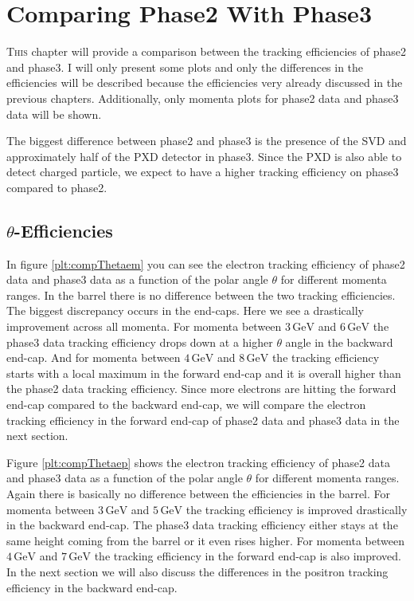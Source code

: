 \documentclass[a4paper,11pt,twosided,final,german,openbib,pdftex,listof=totoc,bibliography=totoc]{scrbook}
\begin{document}
\chapter{Comparing Phase2 With Phase3}
\label{cha:Comp}


\lettrine{T}{his} chapter will provide a comparison between the tracking efficiencies of phase2 and phase3. I will only present some plots and only the differences in the efficiencies will be described because the efficiencies very already discussed in the previous chapters. Additionally, only momenta plots for phase2 data and phase3 data will be shown.
\newline

The biggest difference between phase2 and phase3 is the presence of the SVD and approximately half of the PXD detector in phase3.
Since the PXD is also able to detect charged particle, we expect to have a higher tracking efficiency on phase3 compared to phase2.

\section{$\theta$-Efficiencies}


In figure \ref{plt:compThetaem} you can see the electron tracking efficiency of phase2 data and phase3 data as a function of the polar angle $\theta$ for different momenta ranges. In the barrel there is no difference between the two tracking efficiencies. The biggest discrepancy occurs in the end-caps. Here we see a drastically improvement across all momenta. 
For momenta between $3\,\textrm{GeV}$ and $6\,\textrm{GeV}$ the phase3 data tracking efficiency drops down at a higher $\theta$ angle in the backward end-cap. 
And for momenta between $4\,\textrm{GeV}$ and $8\,\textrm{GeV}$ the tracking efficiency starts with a local maximum in the forward end-cap and it is overall higher than the phase2 data tracking efficiency. Since more electrons are hitting the forward end-cap compared to the backward end-cap, we will compare the electron tracking efficiency in the forward end-cap of phase2 data and phase3 data in the next section. 


Figure \ref{plt:compThetaep} shows the electron tracking efficiency of phase2 data and phase3 data as a function of the polar angle $\theta$ for different momenta ranges. Again there is basically no difference between the efficiencies in the barrel. 
For momenta between $3\,\textrm{GeV}$ and $5\,\textrm{GeV}$ the tracking efficiency is improved drastically in the backward end-cap. The phase3 data tracking efficiency either stays at the same height coming from the barrel or it even rises higher. 
For momenta between $4\,\textrm{GeV}$ and $7\,\textrm{GeV}$ the tracking efficiency in the forward end-cap is also improved. In the next section we will also discuss the differences in the positron tracking efficiency in the backward end-cap.
\end{document}
